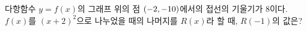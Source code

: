 다항함수 $y=f(x)$의 그래프 위의 점 $(-2{,}\mkern3mu\mathopen{}-10)$에서의 접선의 기울기가 $8$이다. $f(x)$를 $(x+2)^2$으로 나누었을 때의 나머지를 $R(x)$라 할 때, $R(-1)$의 값은?
